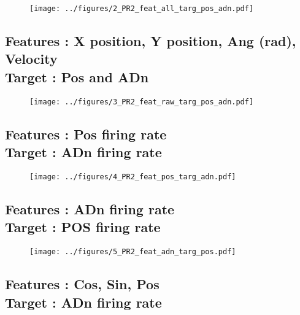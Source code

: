 \documentclass[10pt,a4paper,twocolumn]{article}
\begin{document}
\begin{figure}[H]
	\begin{center}
		\texttt{[image: ../figures/2\_PR2\_feat\_all\_targ\_pos\_adn.pdf]} 
	\end{center}
\end{figure}

\subsection{Features : X position, Y position, Ang (rad), Velocity \\ Target : Pos and ADn}

\begin{figure}[H]
	\begin{center}
		\texttt{[image: ../figures/3\_PR2\_feat\_raw\_targ\_pos\_adn.pdf]} 
	\end{center}
\end{figure}

\subsection{Features : Pos firing rate \\ Target : ADn firing rate}

\begin{figure}[H]
	\begin{center}
		\texttt{[image: ../figures/4\_PR2\_feat\_pos\_targ\_adn.pdf]} 
	\end{center}
\end{figure}

\subsection{Features : ADn firing rate \\ Target : POS firing rate}

\begin{figure}[H]
	\begin{center}
		\texttt{[image: ../figures/5\_PR2\_feat\_adn\_targ\_pos.pdf]} 
	\end{center}
\end{figure}

\subsection{Features : Cos, Sin, Pos \\ Target : ADn firing rate}
\end{document}
